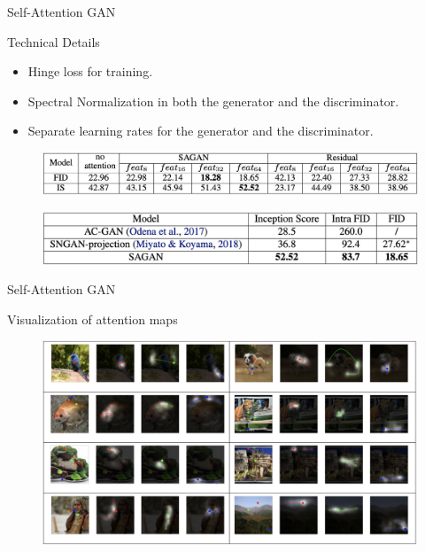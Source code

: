 \begin{frame}{Self-Attention GAN}
	\begin{block}{Technical Details}
		\begin{itemize}
			\item Hinge loss for training.
			\item Spectral Normalization in both the generator and the discriminator.
			\item Separate learning rates for the generator and the discriminator.
		\end{itemize}
	\end{block}
	\begin{figure}
		\centering
		\includegraphics[width=\linewidth]{figs/sa_results1}
	\end{figure}
	\begin{figure}
		\centering
		\includegraphics[width=\linewidth]{figs/sa_results2}
	\end{figure}

\end{frame}
\begin{frame}{Self-Attention GAN}
	\begin{block}{Visualization of attention maps}
		\begin{figure}
			\centering
			\includegraphics[width=\linewidth]{figs/sa_maps}
		\end{figure}
	\end{block}

\end{frame}
